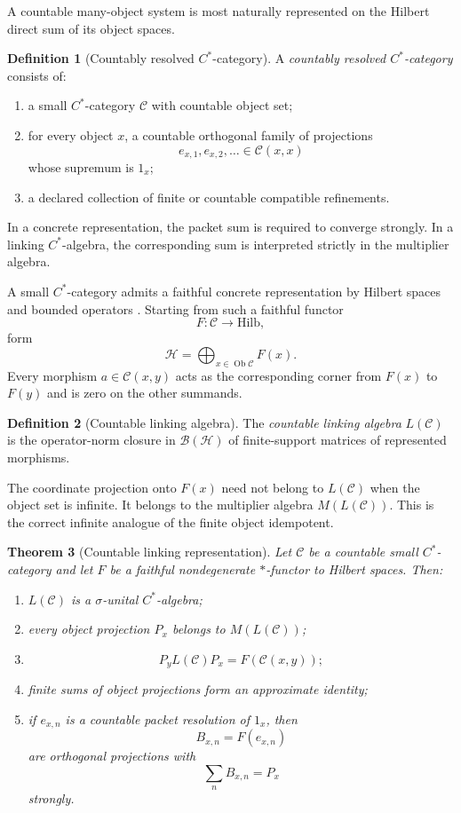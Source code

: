 \documentclass[11pt]{article}
\newtheorem{theorem}{Theorem}[section]
\theoremstyle{definition}
\newtheorem{definition}[theorem]{Definition}
\theoremstyle{remark}
\begin{document}
A countable many-object system is most naturally represented on the Hilbert direct sum of its object spaces.

\begin{definition}[Countably resolved $C^*$-category]
A \emph{countably resolved $C^*$-category} consists of:
\begin{enumerate}[label=\textup{(C\arabic*)}]
\item a small $C^*$-category $\mathcal C$ with countable object set;
\item for every object $x$, a countable orthogonal family of projections
\[
e_{x,1},e_{x,2},\ldots\in\mathcal C(x,x)
\]
whose supremum is $1_x$;
\item a declared collection of finite or countable compatible refinements.
\end{enumerate}
In a concrete representation, the packet sum is required to converge strongly.  In a linking $C^*$-algebra, the corresponding sum is interpreted strictly in the multiplier algebra.
\end{definition}

A small $C^*$-category admits a faithful concrete representation by Hilbert spaces and bounded operators \cite{Mitchener2002}.  Starting from such a faithful functor
\[
F:\mathcal C\longrightarrow\mathrm{Hilb},
\]
form
\[
\mathcal H=\bigoplus_{x\in\operatorname{Ob}\mathcal C}F(x).
\]
Every morphism $a\in\mathcal C(x,y)$ acts as the corresponding corner from $F(x)$ to $F(y)$ and is zero on the other summands.

\begin{definition}[Countable linking algebra]
The \emph{countable linking algebra} $L(\mathcal C)$ is the operator-norm closure in $\mathcal B(\mathcal H)$ of finite-support matrices of represented morphisms.
\end{definition}

The coordinate projection onto $F(x)$ need not belong to $L(\mathcal C)$ when the object set is infinite.  It belongs to the multiplier algebra $M(L(\mathcal C))$.  This is the correct infinite analogue of the finite object idempotent.

\begin{theorem}[Countable linking representation]
Let $\mathcal C$ be a countable small $C^*$-category and let $F$ be a faithful nondegenerate $*$-functor to Hilbert spaces.  Then:
\begin{enumerate}[label=\textup{(\roman*)}]
\item $L(\mathcal C)$ is a $\sigma$-unital $C^*$-algebra;
\item every object projection $P_x$ belongs to $M(L(\mathcal C))$;
\item
\[
P_yL(\mathcal C)P_x=F(\mathcal C(x,y));
\]
\item finite sums of object projections form an approximate identity;
\item if $e_{x,n}$ is a countable packet resolution of $1_x$, then
\[
B_{x,n}=F(e_{x,n})
\]
are orthogonal projections with
\[
\sum_nB_{x,n}=P_x
\]
strongly.
\end{enumerate}
\end{theorem}
\end{document}
